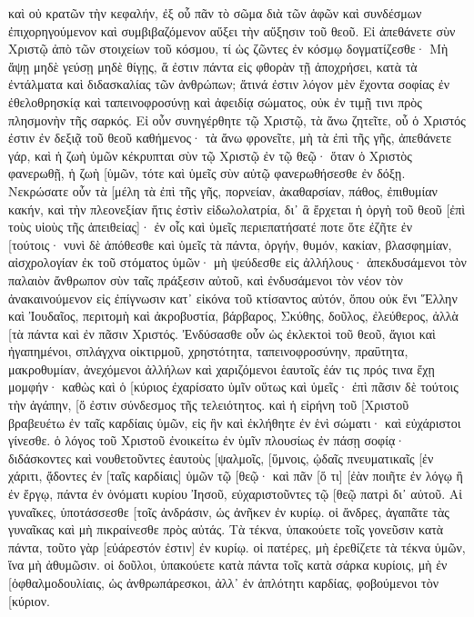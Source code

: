 καὶ οὐ κρατῶν τὴν κεφαλήν, ἐξ οὗ πᾶν τὸ σῶμα διὰ τῶν ἁφῶν καὶ συνδέσμων ἐπιχορηγούμενον καὶ συμβιβαζόμενον αὔξει τὴν αὔξησιν τοῦ θεοῦ. 
Εἰ ἀπεθάνετε σὺν Χριστῷ ἀπὸ τῶν στοιχείων τοῦ κόσμου, τί ὡς ζῶντες ἐν κόσμῳ δογματίζεσθε· 
Μὴ ἅψῃ μηδὲ γεύσῃ μηδὲ θίγῃς, 
ἅ ἐστιν πάντα εἰς φθορὰν τῇ ἀποχρήσει, κατὰ τὰ ἐντάλματα καὶ διδασκαλίας τῶν ἀνθρώπων; 
ἅτινά ἐστιν λόγον μὲν ἔχοντα σοφίας ἐν ἐθελοθρησκίᾳ καὶ ταπεινοφροσύνῃ καὶ ἀφειδίᾳ σώματος, οὐκ ἐν τιμῇ τινι πρὸς πλησμονὴν τῆς σαρκός. 
Εἰ οὖν συνηγέρθητε τῷ Χριστῷ, τὰ ἄνω ζητεῖτε, οὗ ὁ Χριστός ἐστιν ἐν δεξιᾷ τοῦ θεοῦ καθήμενος· 
τὰ ἄνω φρονεῖτε, μὴ τὰ ἐπὶ τῆς γῆς, 
ἀπεθάνετε γάρ, καὶ ἡ ζωὴ ὑμῶν κέκρυπται σὺν τῷ Χριστῷ ἐν τῷ θεῷ· 
ὅταν ὁ Χριστὸς φανερωθῇ, ἡ ζωὴ [ὑμῶν, τότε καὶ ὑμεῖς σὺν αὐτῷ φανερωθήσεσθε ἐν δόξῃ. 
Νεκρώσατε οὖν τὰ [μέλη τὰ ἐπὶ τῆς γῆς, πορνείαν, ἀκαθαρσίαν, πάθος, ἐπιθυμίαν κακήν, καὶ τὴν πλεονεξίαν ἥτις ἐστὶν εἰδωλολατρία, 
δι᾽ ἃ ἔρχεται ἡ ὀργὴ τοῦ θεοῦ [ἐπὶ τοὺς υἱοὺς τῆς ἀπειθείας]· 
ἐν οἷς καὶ ὑμεῖς περιεπατήσατέ ποτε ὅτε ἐζῆτε ἐν [τούτοις· 
νυνὶ δὲ ἀπόθεσθε καὶ ὑμεῖς τὰ πάντα, ὀργήν, θυμόν, κακίαν, βλασφημίαν, αἰσχρολογίαν ἐκ τοῦ στόματος ὑμῶν· 
μὴ ψεύδεσθε εἰς ἀλλήλους· ἀπεκδυσάμενοι τὸν παλαιὸν ἄνθρωπον σὺν ταῖς πράξεσιν αὐτοῦ, 
καὶ ἐνδυσάμενοι τὸν νέον τὸν ἀνακαινούμενον εἰς ἐπίγνωσιν κατ᾽ εἰκόνα τοῦ κτίσαντος αὐτόν, 
ὅπου οὐκ ἔνι Ἕλλην καὶ Ἰουδαῖος, περιτομὴ καὶ ἀκροβυστία, βάρβαρος, Σκύθης, δοῦλος, ἐλεύθερος, ἀλλὰ [τὰ πάντα καὶ ἐν πᾶσιν Χριστός. 
Ἐνδύσασθε οὖν ὡς ἐκλεκτοὶ τοῦ θεοῦ, ἅγιοι καὶ ἠγαπημένοι, σπλάγχνα οἰκτιρμοῦ, χρηστότητα, ταπεινοφροσύνην, πραΰτητα, μακροθυμίαν, 
ἀνεχόμενοι ἀλλήλων καὶ χαριζόμενοι ἑαυτοῖς ἐάν τις πρός τινα ἔχῃ μομφήν· καθὼς καὶ ὁ [κύριος ἐχαρίσατο ὑμῖν οὕτως καὶ ὑμεῖς· 
ἐπὶ πᾶσιν δὲ τούτοις τὴν ἀγάπην, [ὅ ἐστιν σύνδεσμος τῆς τελειότητος. 
καὶ ἡ εἰρήνη τοῦ [Χριστοῦ βραβευέτω ἐν ταῖς καρδίαις ὑμῶν, εἰς ἣν καὶ ἐκλήθητε ἐν ἑνὶ σώματι· καὶ εὐχάριστοι γίνεσθε. 
ὁ λόγος τοῦ Χριστοῦ ἐνοικείτω ἐν ὑμῖν πλουσίως ἐν πάσῃ σοφίᾳ· διδάσκοντες καὶ νουθετοῦντες ἑαυτοὺς [ψαλμοῖς, [ὕμνοις, ᾠδαῖς πνευματικαῖς [ἐν χάριτι, ᾄδοντες ἐν [ταῖς καρδίαις] ὑμῶν τῷ [θεῷ· 
καὶ πᾶν [ὅ τι] [ἐὰν ποιῆτε ἐν λόγῳ ἢ ἐν ἔργῳ, πάντα ἐν ὀνόματι κυρίου Ἰησοῦ, εὐχαριστοῦντες τῷ [θεῷ πατρὶ δι᾽ αὐτοῦ. 
Αἱ γυναῖκες, ὑποτάσσεσθε [τοῖς ἀνδράσιν, ὡς ἀνῆκεν ἐν κυρίῳ. 
οἱ ἄνδρες, ἀγαπᾶτε τὰς γυναῖκας καὶ μὴ πικραίνεσθε πρὸς αὐτάς. 
Τὰ τέκνα, ὑπακούετε τοῖς γονεῦσιν κατὰ πάντα, τοῦτο γὰρ [εὐάρεστόν ἐστιν] ἐν κυρίῳ. 
οἱ πατέρες, μὴ ἐρεθίζετε τὰ τέκνα ὑμῶν, ἵνα μὴ ἀθυμῶσιν. 
οἱ δοῦλοι, ὑπακούετε κατὰ πάντα τοῖς κατὰ σάρκα κυρίοις, μὴ ἐν [ὀφθαλμοδουλίαις, ὡς ἀνθρωπάρεσκοι, ἀλλ᾽ ἐν ἁπλότητι καρδίας, φοβούμενοι τὸν [κύριον. 
